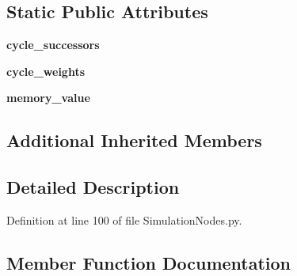 \subsection*{Static Public Attributes}
\begin{DoxyCompactItemize}
\item 
{\bfseries cycle\+\_\+successors}\hypertarget{class_n_e_a_t___py_genetics_1_1_n_e_a_t_1_1_genome_structures_1_1_simulation_structure_1_1_simulation_nodes_1_1_cycle_node_a1af1cde360e80129b245a7db865043e7}{}\label{class_n_e_a_t___py_genetics_1_1_n_e_a_t_1_1_genome_structures_1_1_simulation_structure_1_1_simulation_nodes_1_1_cycle_node_a1af1cde360e80129b245a7db865043e7}

\item 
{\bfseries cycle\+\_\+weights}\hypertarget{class_n_e_a_t___py_genetics_1_1_n_e_a_t_1_1_genome_structures_1_1_simulation_structure_1_1_simulation_nodes_1_1_cycle_node_a5d16cbb003056d70af09c3b827ce37bd}{}\label{class_n_e_a_t___py_genetics_1_1_n_e_a_t_1_1_genome_structures_1_1_simulation_structure_1_1_simulation_nodes_1_1_cycle_node_a5d16cbb003056d70af09c3b827ce37bd}

\item 
{\bfseries memory\+\_\+value}\hypertarget{class_n_e_a_t___py_genetics_1_1_n_e_a_t_1_1_genome_structures_1_1_simulation_structure_1_1_simulation_nodes_1_1_cycle_node_a6bca28573d3931752d70df4440659de3}{}\label{class_n_e_a_t___py_genetics_1_1_n_e_a_t_1_1_genome_structures_1_1_simulation_structure_1_1_simulation_nodes_1_1_cycle_node_a6bca28573d3931752d70df4440659de3}

\end{DoxyCompactItemize}
\subsection*{Additional Inherited Members}


\subsection{Detailed Description}


Definition at line 100 of file Simulation\+Nodes.\+py.



\subsection{Member Function Documentation}
